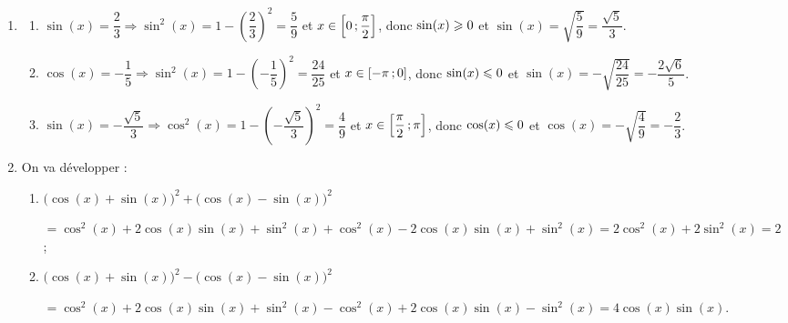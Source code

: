 \documentclass[a4paper,11pt]{article}
\begin{document}
\medskip


\begin{enumerate}
	\item 
	\begin{enumerate}
		\item $\sin(x)=\dfrac23 \Rightarrow \sin^2(x)=1-\left(\dfrac23\right)^2=\dfrac59$ et $x \in \mbox{\ensuremath{\left[0\mathpunct{};\dfrac{\pi}{2}\right]}}$, donc $\sin(x)\geqslant 0$ et $\sin(x)=\sqrt{\dfrac59}=\dfrac{\sqrt{5}}{3}$.
		\item $\cos(x)=-\dfrac15 \Rightarrow \sin^2(x)=1-\left(-\dfrac15\right)^2=\dfrac{24}{25}$ et $x \in \mbox{\ensuremath{\left[-\pi\mathpunct{};0\right]}}$, donc $\sin(x) \leqslant0$ et  $\sin(x)=-\sqrt{\dfrac{24}{25}}=-\dfrac{2\sqrt{6}}{5}$.
		\item $\sin(x)=-\dfrac{\sqrt{5}}{3} \Rightarrow \cos^2(x)=1-\left(-\dfrac{\sqrt{5}}{3}\right)^2=\dfrac49$ et $x \in \mbox{\ensuremath{\left[\dfrac{\pi}{2}\mathpunct{};\pi\right]}}$, donc $\cos(x) \leqslant0$ et $\cos(x)=-\sqrt{\dfrac49} = -\dfrac23$.
	\end{enumerate}
	\item On va développer :
	\begin{enumerate}
		\item $\big(\cos(x) + \sin(x)\big)^2 + \big(\cos(x) - \sin(x)\big)^2$
		
		\hspace{1cm}$=\cos^2(x)+2\cos(x)\sin(x)+\sin^2(x)+\cos^2(x)-2\cos(x)\sin(x)+\sin^2(x) = 2\cos^2(x)+2\sin^2(x) = 2$ ;
		\item $\big(\cos(x) + \sin(x)\big)^2 - \big(\cos(x) - \sin(x)\big)^2$
		
		\hspace{1cm}$=\cos^2(x)+2\cos(x)\sin(x)+\sin^2(x)-\cos^2(x)+2\cos(x)\sin(x)-\sin^2(x) = 4\cos(x)\sin(x)$.
	\end{enumerate}
\end{enumerate}
\end{document}
